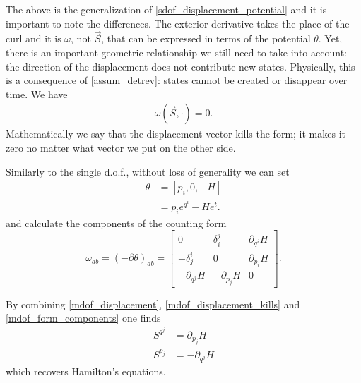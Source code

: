 \documentclass[10pt,twocolumn, nofootinbib]{revtex4-2}
\begin{document}
The above is the generalization of \ref{sdof_displacement_potential} and it is important to note the differences. The exterior derivative takes the place of the curl and it is $\omega$, not $\vec{S}$, that can be expressed in terms of the potential $\theta$. Yet, there is an important geometric relationship we still need to take into account: the direction of the displacement does not contribute new states. Physically, this is a consequence of \ref{assum_detrev}: states cannot be created or disappear over time. We have
\begin{align}\label{mdof_displacement_kills}
	\omega(\vec{S}, \cdot) = 0.
\end{align}
Mathematically we say that the displacement vector kills the form; it makes it zero no matter what vector we put on the other side.

Similarly to the single d.o.f., without loss of generality we can set
\begin{equation}\label{mdof_potential_expression}
\begin{aligned}
	\theta &= [p_i, 0, -H] \\
	&= p_i e^{q^i} - H e^t.
\end{aligned}
\end{equation}
and calculate the components of the counting form
\begin{equation}\label{mdof_form_components}
	\omega_{ab} = (-\partial\theta)_{ab} = \begin{bmatrix}
		0 & \delta^j_i & \partial_{q^i} H \\
		-\delta^i_j & 0 & \partial_{p_i} H \\
		-\partial_{q^j} H & -\partial_{p_j} H & 0
	\end{bmatrix}.
\end{equation}

By combining \ref{mdof_displacement}, \ref{mdof_displacement_kills} and \ref{mdof_form_components} one finds
\begin{equation}\label{mdof_Ham_eq}
\begin{aligned}
	S^{q^j} &= \partial_{p_j} H \\
	S^{p_j} &= - \partial_{q^j} H
\end{aligned}
\end{equation}
which recovers Hamilton's equations.
\end{document}

